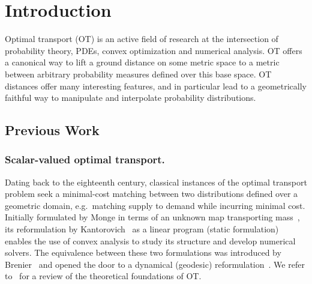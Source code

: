 
\section{Introduction}
\label{sec-intro}


Optimal transport (OT) is an active field of research at the intersection of probability theory, PDEs, convex optimization and numerical analysis. 
%
OT offers a canonical way to lift a ground distance on some metric space to a metric between arbitrary probability measures defined over this base space. OT distances offer many interesting  features, and in particular lead to a geometrically faithful way to manipulate and interpolate probability distributions.




\subsection{Previous Work}

\subsubsection{Scalar-valued optimal transport.}
%
Dating back to the eighteenth century, classical instances of the optimal transport problem seek a minimal-cost matching between two distributions defined over a geometric domain, e.g.\ matching supply to demand while incurring minimal cost. 
Initially formulated by Monge in terms of an unknown map transporting mass~, its reformulation by Kantorovich~ as a linear program (static formulation) enables the use of convex analysis to study its structure and develop numerical solvers. 
% 
The equivalence between these two formulations was introduced by Brenier~ and opened the door to a dynamical (geodesic) reformulation~\cite{benamou2000computational}. We refer to~\cite{santambrogio2015optimal} for a review of the theoretical foundations of OT. 
%

